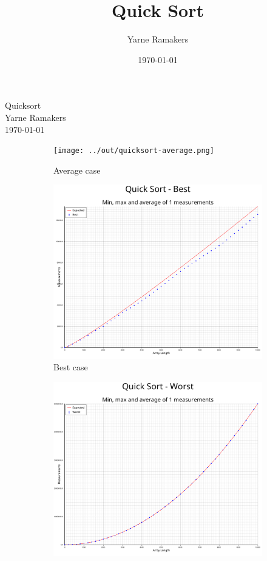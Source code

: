\documentclass[a4paper]{article}
\title{Quick Sort}
\author{Yarne Ramakers}
\date{\today}
\begin{document}
\begin{center}
  Quicksort \\
  Yarne Ramakers \\
  \today \\
\end{center}

\begin{figure}[h]
  \begin{subfigure}{0.3\textwidth}
    \texttt{[image: ../out/quicksort-average.png]}
    \caption{Average case}
    \label{fig:merge-avg}
  \end{subfigure}
  \begin{subfigure}[b]{0.3\textwidth}
    \includegraphics[width=\textwidth]{../out/quicksort-best.png}
    \caption{Best case}
    \label{fig:merge-best}
  \end{subfigure}
  \begin{subfigure}[b]{0.3\textwidth}
    \includegraphics[width=\textwidth]{../out/quicksort-worst.png}

\end{subfigure}
\end{figure}
\end{document}
